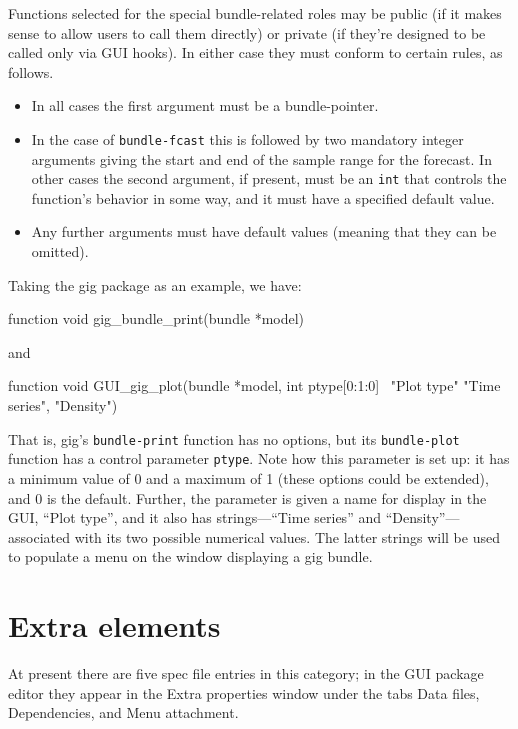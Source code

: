 \documentclass[oneside]{book}
\begin{document}
Functions selected for the special bundle-related roles may be public (if it
makes sense to allow users to call them directly) or private (if they're
designed to be called only via GUI hooks). In either case they must conform
to certain rules, as follows.
\begin{itemize}
\item In all cases the first argument must be a bundle-pointer.
\item In the case of \texttt{bundle-fcast} this is followed by two
  mandatory integer arguments giving the start and end of the sample
  range for the forecast. In other cases the second argument, if
  present, must be an \texttt{int} that controls the function's
  behavior in some way, and it must have a specified default value.
\item Any further arguments must have default values (meaning that
  they can be omitted).
\end{itemize}

Taking the \textsf{gig} package as an example, we have:
%
\begin{code}
  function void gig_bundle_print(bundle *model)
\end{code}
%
and
%
\begin{code}
  function void GUI_gig_plot(bundle *model, int ptype[0:1:0] \
                             "Plot type" {"Time series", "Density"})
\end{code}

That is, \textsf{gig}'s \texttt{bundle-print} function has no options,
but its \texttt{bundle-plot} function has a control parameter
\texttt{ptype}. Note how this parameter is set up: it has a minimum
value of 0 and a maximum of 1 (these options could be extended), and 0
is the default. Further, the parameter is given a name for display in
the GUI, ``Plot type'', and it also has strings---``Time series'' and
``Density''---associated with its two possible numerical values. The
latter strings will be used to populate a menu on the window
displaying a \textsf{gig} bundle.

\section{Extra elements}
\label{sec:spec-extra}

At present there are five spec file entries in this category; in the
GUI package editor they appear in the \textsf{Extra properties} window
under the tabs \textsf{Data files}, \textsf{Dependencies}, and
\textsf{Menu attachment}.
\end{document}
